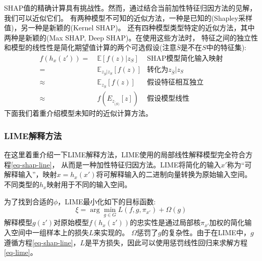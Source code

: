 \documentclass[12pt, a4paper, oneside]{ctexart}
\numberwithin{equation}{section}  %
\def\E{\mathbb{E}}          %
\begin{document}
SHAP值的精确计算具有挑战性。然而，通过结合当前加性特征归因方法的见解，我们可以近似它们。
有两种模型不可知的近似方法，一种是已知的(Shapley采样值)，另一种是新颖的(Kernel SHAP)。
还有四种模型类型特定的近似方法，其中两种是新颖的(Max SHAP, Deep SHAP)。在使用这些方法时，
特征之间的独立性和模型的线性性是简化期望值计算的两个可选假设(注意$\bar{S}$是不在$S$中的特征集):
\begin{align}
    \nonumber f(h_x(z')) =&\ \E[f(z)|z_S] &\text{SHAP模型简化输入映射}\\
    \nonumber =&\ \E_{z_{\bar{S}}|z_{S}}[f(z)]&\text{转化为}z_{\bar{S}}|z_{S}\\
    \nonumber \approx&\ \E_{z_{\bar{S}}}[f(z)]&\text{假设特征相互独立}\\
    \label{eq-shap-model-line}\approx&\ f(E_{z_{\bar(S)}}[z])&\text{假设模型线性}
\end{align}
下面我们着重介绍模型未知时的近似计算方法。
\subsubsection{LIME解释方法}
在这里着重介绍一下LIME解释方法，LIME使用的局部线性解释模型完全符合方程\ref{eq-shap-line}，
从而是一种加性特征归因方法。LIME将简化的输入$x'$称为“可解释输入”，映射$x=h_x(x')$将可解释输入的二进制向量转换为原始输入空间。
不同类型的$h_x$映射用于不同的输入空间。

为了找到合适的$\phi$，LIME最小化如下的目标函数:
\begin{equation}\label{eq-lime}
\xi=\arg\min\limits_{g\in G}L(f,g,\pi_{x'})+\Omega(g)
\end{equation}
解释模型$g(z')$对原始模型$f(h_x(z'))$的忠实性是通过局部核$\pi_{x'}$加权的简化输入空间中一组样本上的损失$L$来实现的。
$\Omega$惩罚了$g$的复杂性。由于在LIME中，$g$遵循方程\ref{eq-shap-line}，$L$是平方损失，因此可以使用惩罚线性回归来求解方程\ref{eq-lime}。
\end{document}
